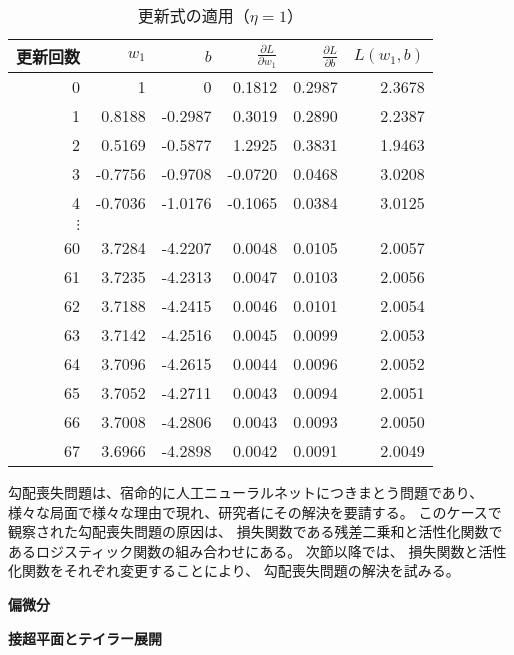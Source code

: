 \begin{table}
  \centering
  \begin{tabular}{rrrrrr}
    \toprule
    更新回数 & $w_1$ & $b$ & $\frac{\partial L}{\partial w_1}$ & $\frac{\partial L}{\partial b}$ & $L(w_1, b)$ \\
    \midrule
    0 & 1 & 0 & 0.1812 & 0.2987 & 2.3678 \\
    1 & 0.8188 & -0.2987 & 0.3019 & 0.2890 & 2.2387 \\
    2 & 0.5169 & -0.5877 & 1.2925 & 0.3831 & 1.9463 \\
    3 & -0.7756 & -0.9708 & -0.0720 & 0.0468 & 3.0208 \\
    4 & -0.7036 & -1.0176 & -0.1065 & 0.0384 & 3.0125 \\
    $\vdots$ &&&&&\\
    60 & 3.7284 & -4.2207 & 0.0048 & 0.0105 & 2.0057 \\
    61 & 3.7235 & -4.2313 & 0.0047 & 0.0103 & 2.0056 \\
    62 & 3.7188 & -4.2415 & 0.0046 & 0.0101 & 2.0054 \\
    63 & 3.7142 & -4.2516 & 0.0045 & 0.0099 & 2.0053 \\
    64 & 3.7096 & -4.2615 & 0.0044 & 0.0096 & 2.0052 \\
    65 & 3.7052 & -4.2711 & 0.0043 & 0.0094 & 2.0051 \\
    66 & 3.7008 & -4.2806 & 0.0043 & 0.0093 & 2.0050 \\
    67 & 3.6966 & -4.2898 & 0.0042 & 0.0091 & 2.0049 \\
    \bottomrule
  \end{tabular}
  \caption{更新式の適用（$\eta = 1$）}
  \label{tab:update-lr-1}
\end{table}

勾配喪失問題は、宿命的に人工ニューラルネットにつきまとう問題であり、
様々な局面で様々な理由で現れ、研究者にその解決を要請する。
このケースで観察された勾配喪失問題の原因は、
損失関数である残差二乗和と活性化関数であるロジスティック関数の組み合わせにある。
次節以降では、
損失関数と活性化関数をそれぞれ変更することにより、
勾配喪失問題の解決を試みる。

\begin{itembox}{\bf 偏微分}
  
\end{itembox}

\begin{itembox}{\bf 接超平面とテイラー展開}
  
\end{itembox}

